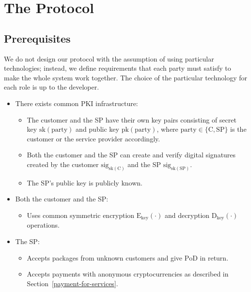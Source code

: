 \documentclass{ieeeaccess}
\begin{document}
\section{The Protocol}\label{sec:protocol}

\subsection{Prerequisites}
We do not design our protocol with the assumption of using particular technologies; instead, we define requirements that each party must satisfy to make the whole system work together. The choice of the particular technology for each role is up to the developer.

\begin{itemize}
\item There exists common PKI infrastructure:
    \begin{itemize}
        \item The customer and the SP have their own key pairs consisting of secret key $\mathrm{sk}(\mathrm{party})$ and public key $\mathrm{pk}(\mathrm{party})$, where $\mathrm{party} \in \{\mathrm{C}, \mathrm{SP}\}$ is the customer or the service provider accordingly.
        \item Both the customer and the SP can create and verify digital signatures created by the customer $\mathrm{sig}_{\mathrm{sk}(\mathrm{C})}$ and the SP $\mathrm{sig}_{\mathrm{sk}(\mathrm{SP})}$.
        \item The SP's public key is publicly known.
    \end{itemize}
    
\item Both the customer and the SP:
    \begin{itemize}
        \item Uses common symmetric encryption $\mathrm{E}_\mathrm{key}(\cdot)$ and decryption $\mathrm{D}_\mathrm{key}(\cdot)$ operations.
    \end{itemize}

\item The SP:
    \begin{itemize}
        \item Accepts packages from unknown customers and give $\mathrm{PoD}$ in return.
        \item Accepts payments with anonymous cryptocurrencies as described in Section~\ref{payment-for-services}.
    \end{itemize}
    

\end{itemize}
\end{document}
